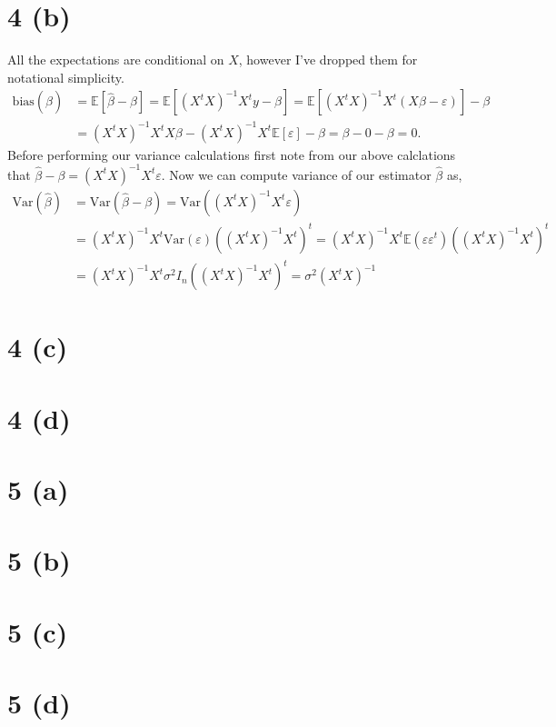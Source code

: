 \documentclass[10pt]{article}
\def\E{\mathbb{E}}
\def\Var{\text{Var}}
\begin{document}
\section*{4 (b)}
All the expectations are conditional on $X$, however I've dropped them for notational simplicity.
\begin{align*}
    \text{bias}(\hat{\beta}) &= \E[\hat{\beta} - \beta] = \E[(X^tX)^{-1}X^ty - \beta] = \E[(X^tX)^{-1}X^t(X\beta - \varepsilon)] - \beta \\
    &= (X^tX)^{-1}X^tX\beta - (X^tX)^{-1}X^t\E[\varepsilon] - \beta = \beta - 0 - \beta  = 0.
\end{align*}
Before performing our variance calculations first note from our above calclations that
$\hat{\beta} - \beta = (X^tX)^{-1}X^t \varepsilon.$ Now we can compute variance of our estimator
$\hat{\beta}$ as,
\begin{align*}
    \Var(\hat{\beta}) & = \Var(\hat{\beta} - \beta) = \Var((X^tX)^{-1}X^t \varepsilon) \\
    & = (X^tX)^{-1}X^t \Var(\varepsilon) ((X^tX)^{-1}X^t)^t =  (X^tX)^{-1}X^t \E(\varepsilon \varepsilon^t) ((X^tX)^{-1}X^t)^t \\
    & = (X^tX)^{-1}X^t \sigma^2 I_n ((X^tX)^{-1}X^t)^t  = \sigma^2(X^tX)^{-1}
\end{align*}
\section*{4 (c)}
\section*{4 (d)}

\section*{5 (a)}
\section*{5 (b)}
\section*{5 (c)}
\section*{5 (d)}
\end{document}
